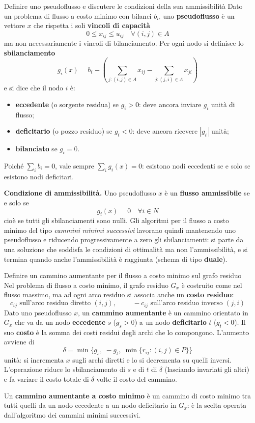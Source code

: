 \documentclass[12pt]{extarticle} %
\begin{document}
\begin{teoriabox}{Definire uno pseudoflusso e discutere le condizioni della sua ammissibilità}
Dato un problema di flusso a costo minimo con bilanci $b_i$, uno \textbf{pseudoflusso} è un vettore $x$ che rispetta i soli \textbf{vincoli di capacità}
\[
0 \le x_{ij} \le u_{ij} \quad \forall (i,j)\in A
\]
ma non necessariamente i vincoli di bilanciamento. Per ogni nodo si definisce lo \textbf{sbilanciamento}
\[
g_i(x) = b_i - \left( \sum_{j:(i,j)\in A} x_{ij} - \sum_{j:(j,i)\in A} x_{ji}\right)
\]
e si dice che il nodo $i$ è:
\begin{itemize}
    \item \textbf{eccedente} (o sorgente residua) se $g_i > 0$: deve ancora inviare $g_i$ unità di flusso;
    \item \textbf{deficitario} (o pozzo residuo) se $g_i < 0$: deve ancora ricevere $|g_i|$ unità;
    \item \textbf{bilanciato} se $g_i = 0$.
\end{itemize}
Poiché $\sum_i b_i = 0$, vale sempre $\sum_i g_i(x) = 0$: esistono nodi eccedenti se e solo se esistono nodi deficitari.

\noindent\textbf{Condizione di ammissibilità.} Uno pseudoflusso $x$ è un \textbf{flusso ammissibile} se e solo se
\[
g_i(x) = 0 \quad \forall i \in N
\]
cioè se tutti gli sbilanciamenti sono nulli. Gli algoritmi per il flusso a costo minimo del tipo \textit{cammini minimi successivi} lavorano quindi mantenendo uno pseudoflusso e riducendo progressivamente a zero gli sbilanciamenti: si parte da una soluzione che soddisfa le condizioni di ottimalità ma non l'ammissibilità, e si termina quando anche l'ammissibilità è raggiunta (schema di tipo \textbf{duale}).
\end{teoriabox}

\begin{teoriabox}{Definire un cammino aumentante per il flusso a costo minimo sul grafo residuo}
Nel problema di flusso a costo minimo, il grafo residuo $G_x$ è costruito come nel flusso massimo, ma ad ogni arco residuo si associa anche un \textbf{costo residuo}:
\[
c_{ij} \text{ sull'arco residuo diretto } (i,j), \hspace{1cm} -c_{ij} \text{ sull'arco residuo inverso } (j,i)
\]
Dato uno pseudoflusso $x$, un \textbf{cammino aumentante} è un cammino orientato in $G_x$ che va da un nodo \textbf{eccedente} $s$ ($g_s > 0$) a un nodo \textbf{deficitario} $t$ ($g_t < 0$). Il suo \textbf{costo} è la somma dei costi residui degli archi che lo compongono. L'aumento avviene di
\[
\delta = \min\Big\{ g_s, \; -g_t, \; \min\{r_{ij} : (i,j)\in P\} \Big\}
\]
unità: si incrementa $x$ sugli archi diretti e lo si decrementa su quelli inversi. L'operazione riduce lo sbilanciamento di $s$ e di $t$ di $\delta$ (lasciando invariati gli altri) e fa variare il costo totale di $\delta$ volte il costo del cammino.

\noindent Un \textbf{cammino aumentante a costo minimo} è un cammino di costo minimo tra tutti quelli da un nodo eccedente a un nodo deficitario in $G_x$: è la scelta operata dall'algoritmo dei cammini minimi successivi.
\end{teoriabox}
\end{document}

